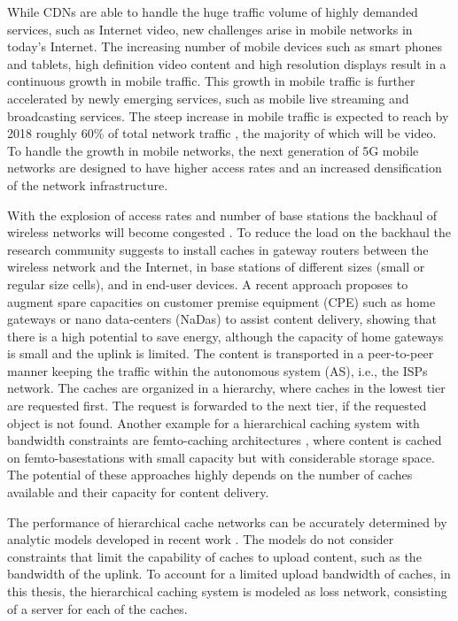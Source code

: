 While CDNs are able to handle the huge traffic volume of highly demanded services, such as Internet video, new challenges arise in mobile networks in today's Internet.
The increasing number of mobile devices such as smart phones and tablets, high definition video content and high resolution displays result in a continuous growth in mobile traffic.
This growth in mobile traffic is further accelerated by newly emerging services, such as mobile live streaming and broadcasting services.
The steep increase in mobile traffic is expected to reach by 2018 roughly 60\% of total network traffic \cite{cisco2016}, the majority of which will be video.
To handle the growth in mobile networks, the next generation of 5G mobile networks are designed to have higher access rates and an increased densification of the network infrastructure.

With the explosion of access rates and number of base stations the backhaul of wireless networks will become congested \cite{paschos2016wireless}.
To reduce the load on the backhaul the research community suggests to install caches in gateway routers between the wireless network and the Internet, in base stations of different sizes (small or regular size cells), and in end-user devices.
A recent approach \cite{valancius2009greening} proposes to augment spare capacities on customer premise equipment (CPE) such as home gateways or nano data-centers (NaDas) to assist content delivery, showing that there is a high potential to save energy, although the capacity of home gateways is small and the uplink is limited.
The content is transported in a peer-to-peer manner keeping the traffic within the autonomous system (AS), i.e., the ISPs network.
The caches are organized in a hierarchy, where caches in the lowest tier are requested first. The request is forwarded to the next tier, if the requested object is not found.
Another example for a hierarchical caching system with bandwidth constraints are femto-caching architectures \cite{golrezaei2013femtocaching}, where content is cached on femto-basestations with small capacity but with considerable storage space.
The potential of these approaches highly depends on the number of caches available and their capacity for content delivery.

The performance of hierarchical cache networks can be accurately determined by analytic models developed in recent work \cite{che2002hierarchical, martina2014unified}.
The models do not consider constraints that limit the capability of caches to upload content, such as the bandwidth of the uplink.
To account for a limited upload bandwidth of caches, in this thesis, the hierarchical caching system is modeled as loss network, consisting of a server for each of the caches.

